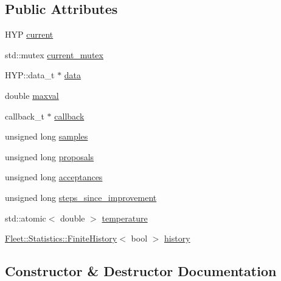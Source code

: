 \subsection*{Public Attributes}
\begin{DoxyCompactItemize}
\item 
H\+YP \hyperlink{class_m_c_m_c_chain_ab0c3b31e96d1f703bb8cf55c0575b4bd}{current}
\item 
std\+::mutex \hyperlink{class_m_c_m_c_chain_a42c355121fce0476426a49d5498c38a1}{current\+\_\+mutex}
\item 
H\+Y\+P\+::data\+\_\+t $\ast$ \hyperlink{class_m_c_m_c_chain_ab235f08fad93a9626ffb566c001ed5c9}{data}
\item 
double \hyperlink{class_m_c_m_c_chain_a3b8d31f47d75503321b432eeac0bb13b}{maxval}
\item 
callback\+\_\+t $\ast$ \hyperlink{class_m_c_m_c_chain_aa7a4a0d46ae2d9818c2f076f839badd7}{callback}
\item 
unsigned long \hyperlink{class_m_c_m_c_chain_a0d3ac649b04077cd0ffea236df560c91}{samples}
\item 
unsigned long \hyperlink{class_m_c_m_c_chain_aec2cdd6a3e25447c7f34e31d0d98dbcb}{proposals}
\item 
unsigned long \hyperlink{class_m_c_m_c_chain_ae1597e42074b2efb93ace3e40f1f7a45}{acceptances}
\item 
unsigned long \hyperlink{class_m_c_m_c_chain_aeac1cd63d13c397ba01cca35b605b786}{steps\+\_\+since\+\_\+improvement}
\item 
std\+::atomic$<$ double $>$ \hyperlink{class_m_c_m_c_chain_a7173287e1c0e681a9912a84c87320ece}{temperature}
\item 
\hyperlink{class_fleet_1_1_statistics_1_1_finite_history}{Fleet\+::\+Statistics\+::\+Finite\+History}$<$ bool $>$ \hyperlink{class_m_c_m_c_chain_a2595f417e0c9cc847ac1dd70ed8b0763}{history}
\end{DoxyCompactItemize}


\subsection{Constructor \& Destructor Documentation}
\mbox{\label{class_m_c_m_c_chain_aed5ffea5a46a380b8b0d78cd46c96a97}} 

